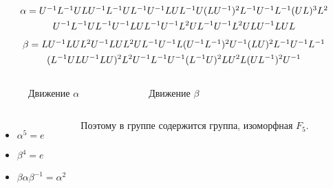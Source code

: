 \documentclass{beamer}
\begin{document}
\begin{frame}
\begin{multline*} %
$$
\alpha=U^{-1}L^{-1}ULU^{-1}L^{-1}UL^{-1}U^{-1}LUL^{-1}U(LU^{-1})^2L^{-1}U^{-1}L^{-1}(UL)^3L^2 \\
U^{-1}L^{-1}UL^{-1}U^{-1}LUL^{-1}U^{-1}L^2UL^{-1}U^{-1}L^2ULU^{-1}LUL
$$
\end{multline*}
\begin{multline*} %
$$
\beta=LU^{-1}LUL^2U^{-1}LUL^2UL^{-1}U^{-1}L(U^{-1}L^{-1})^2U^{-1}(LU)^2L^{-1}U^{-1}L^{-1}\\ 
(L^{-1}ULU^{-1}LU)^2L^2U^{-1}L^{-1}U^{-1}(L^{-1}U)^2LU^2L(UL^{-1})^2U^{-1}
$$
\end{multline*}
\begin{columns}
	\RubikCubeSolved
	\vspace*{-1cm}
	\begin{figure}[c]
		\caption{Движение $\alpha$}
	\end{figure}
	\RubikCubeSolved
	\vspace*{-1cm}
	\begin{figure}[c]
		\caption{Движение $\beta$}
	\end{figure}
\end{columns}
\begin{columns}
\begin{itemize}
\item $\alpha^5=e$
\item $\beta^4=e$
\item $\beta\alpha\beta^{-1}=\alpha^2$
\end{itemize}
Поэтому в группе содержится группа, изоморфная $F_5$.
\end{columns}
\end{frame}

\end{document}
